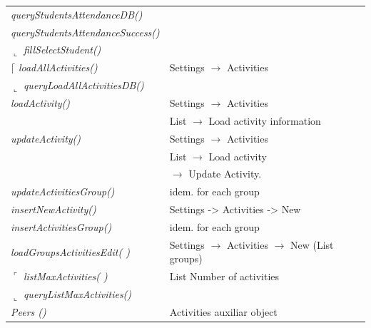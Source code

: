 \begin{bclogo}[couleur=orange!30,logo=\bcbook, arrondi=0.1,ombre=true ]
\begin{tabular}{ll}
\emph{ queryStudentsAttendanceDB() }    & {  }\\
\emph{ queryStudentsAttendanceSuccess()}&    {   }\\
$\llcorner$\emph{ fillSelectStudent() }          & {  } \\
$\lceil$ \emph { loadAllActivities() }           &{  Settings $\rightarrow$ Activities  } \\
$\llcorner$\emph { queryLoadAllActivitiesDB()}     &{   } \\
\emph { loadActivity()}                & { Settings $\rightarrow$  Activities } \\
                                        & { List  $\rightarrow$ Load activity information } \\
\emph { updateActivity()}              &  { Settings $\rightarrow$ Activities }\\ 
                                       &  { List $\rightarrow$ Load activity } \\
                                       &  { $\rightarrow$ Update Activity. } \\
%
\emph { updateActivitiesGroup() }       & {idem. for each group } \\
%
\emph { insertNewActivity() }        & {Settings -> Activities -> New }\\
\emph { insertActivitiesGroup()}       & {idem. for each group } \\
%
\emph { loadGroupsActivitiesEdit( )}    & {Settings $\rightarrow$  Activities $\rightarrow$  New (List groups) } \\
$\ulcorner$ \emph { listMaxActivities( ) }          &{ List Number of activities } \\
$\llcorner$ \emph { queryListMaxActivities() }      &{  } \\
\emph{ Peers () }                          & Activities auxiliar object \\

\end{tabular}
\end{bclogo}  


\newpage


